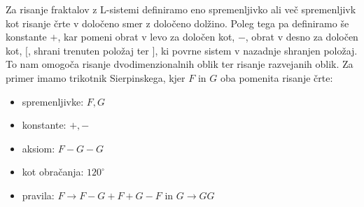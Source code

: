 \documentclass[a4paper, 12px]{article}
\begin{document}
        \addvspace{0.5cm}
        Za risanje fraktalov z L-sistemi definiramo eno spremenljivko ali več spremenljivk kot risanje črte v določeno smer z določeno dolžino.
        Poleg tega pa definiramo še konstante $+$, kar pomeni obrat v levo za določen kot, $-$, obrat v desno za določen kot, $[$, shrani trenuten položaj ter $]$, ki povrne sistem v nazadnje shranjen položaj.
        To nam omogoča risanje dvodimenzionalnih oblik ter risanje razvejanih oblik.
        Za primer imamo trikotnik Sierpinskega, kjer $F$ in $G$ oba pomenita risanje črte:
        \cite{LSystem}
        \begin{itemize}
            \item[] spremenljivke: $F, G$
            \item[] konstante: $+, -$
            \item[] aksiom: $F-G-G$
            \item[] kot obračanja: $120^\circ$
            \item[] pravila: $F \rightarrow F-G+F+G-F$ in $G \rightarrow GG$    
        \end{itemize} 
\end{document}
